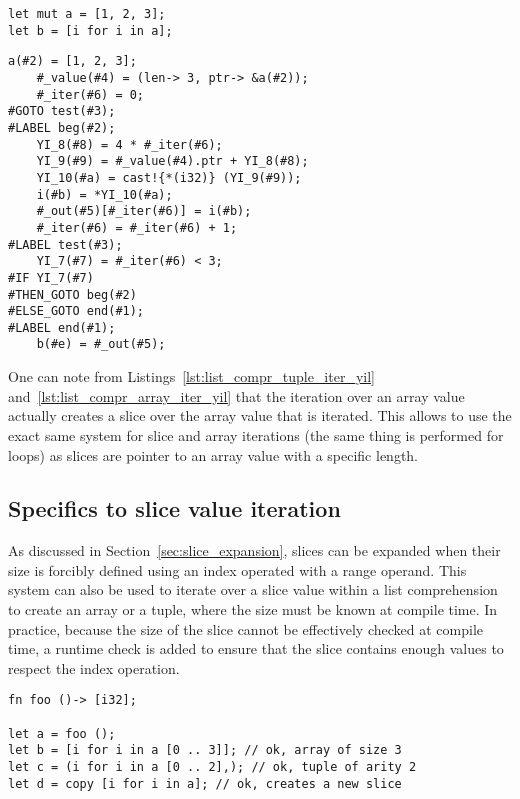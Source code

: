 \begin{lstlisting}[style=coloredverbatim, label=lst:list_compr_array_iter, caption=List comprehension iterating over an array]
let mut a = [1, 2, 3];
let b = [i for i in a];
\end{lstlisting}

\begin{lstlisting}[style=intermediateVerb, label=lst:list_compr_array_iter_yil, caption=YIL representation of Listing~\ref{lst:list_compr_array_iter}]
    a(#2) = [1, 2, 3];
    #_value(#4) = (len-> 3, ptr-> &a(#2));
    #_iter(#6) = 0;
#GOTO test(#3);
#LABEL beg(#2);
    YI_8(#8) = 4 * #_iter(#6);
    YI_9(#9) = #_value(#4).ptr + YI_8(#8);
    YI_10(#a) = cast!{*(i32)} (YI_9(#9));
    i(#b) = *YI_10(#a);
    #_out(#5)[#_iter(#6)] = i(#b);
    #_iter(#6) = #_iter(#6) + 1;
#LABEL test(#3);
    YI_7(#7) = #_iter(#6) < 3;
#IF YI_7(#7)
#THEN_GOTO beg(#2)
#ELSE_GOTO end(#1);
#LABEL end(#1);
    b(#e) = #_out(#5);
\end{lstlisting}

One can note from Listings~\ref{lst:list_compr_tuple_iter_yil}
and~\ref{lst:list_compr_array_iter_yil} that the iteration over an array value
actually creates a slice over the array value that is iterated. This allows to
use the exact same system for slice and array iterations (the same thing is
performed for  loops) as slices are pointer to an array value with a
specific length.

\subsection{Specifics to slice value iteration}

As discussed in Section~\ref{sec:slice_expansion}, slices can be expanded when
their size is forcibly defined using an index operated with a range operand.
This system can also be used to iterate over a slice value within a list
comprehension to create an array or a tuple, where the size must be known at
compile time. In practice, because the size of the slice cannot be effectively
checked at compile time, a runtime check is added to ensure that the slice
contains enough values to respect the index operation.

\begin{lstlisting}[style=coloredverbatim, label=lst:list_compr_slice_to_array, caption=List comprehension over a slice with cte size]
fn foo ()-> [i32];

let a = foo ();
let b = [i for i in a [0 .. 3]]; // ok, array of size 3
let c = (i for i in a [0 .. 2],); // ok, tuple of arity 2
let d = copy [i for i in a]; // ok, creates a new slice
\end{lstlisting}

